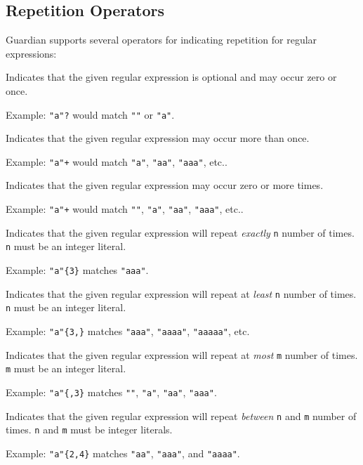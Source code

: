 
\subsection{Repetition Operators}
{
	Guardian supports several operators for indicating
	repetition for regular expressions:
	
	\begin{itemize}
	{
		\item[\texttt{(...)?}] Indicates that the given regular
			expression is optional
			and may occur zero or once. 
			
			Example: \texttt{"a"?} would match \texttt{""} or \texttt{"a"}.
		\item[\texttt{(...)+}] Indicates that the given regular
			expression may occur
			more than once.
			
			Example: \texttt{"a"+} would match \texttt{"a"},
				\texttt{"aa"}, \texttt{"aaa"}, etc..
		\item[\texttt{(...)*}] Indicates that the given regular
			expression may occur
			zero or more times.
			
			Example: \texttt{"a"+} would match \texttt{""}, \texttt{"a"},
				\texttt{"aa"}, \texttt{"aaa"}, etc..
		\item[\texttt{(...)\{n\}}] Indicates that the given regular
			expression will
			repeat \textit{exactly} \texttt{n} number of times.
			\texttt{n} must be an integer
			literal.
			
			Example: \texttt{"a"\{3\}} matches \texttt{"aaa"}.
		\item[\texttt{(...)\{n,\}}] Indicates that the given regular
			expression will
			repeat at \textit{least} \texttt{n} number of
			times. \texttt{n} must be an integer
			literal.
			
			Example: \texttt{"a"\{3,\}} matches \texttt{"aaa"}, \texttt{"aaaa"},
			\texttt{"aaaaa"}, etc.
		\item[\texttt{(...)\{,m\}}] Indicates that the given regular
			expression will
			repeat at \textit{most} \texttt{m} number of
			times. \texttt{m} must be an integer literal.
			
			Example: \texttt{"a"\{,3\}} matches \texttt{""}, \texttt{"a"},
			\texttt{"aa"}, \texttt{"aaa"}.
		\item[\texttt{(...)\{n,m\}}] Indicates that the given regular
			expression will
			repeat \textit{between} \texttt{n} and \texttt{m} number of
			times. \texttt{n} and \texttt{m} must be integer literals.
			
			Example: \texttt{"a"\{2,4\}} matches \texttt{"aa"}, \texttt{"aaa"},
			and \texttt{"aaaa"}.
	}
	\end{itemize}
}

